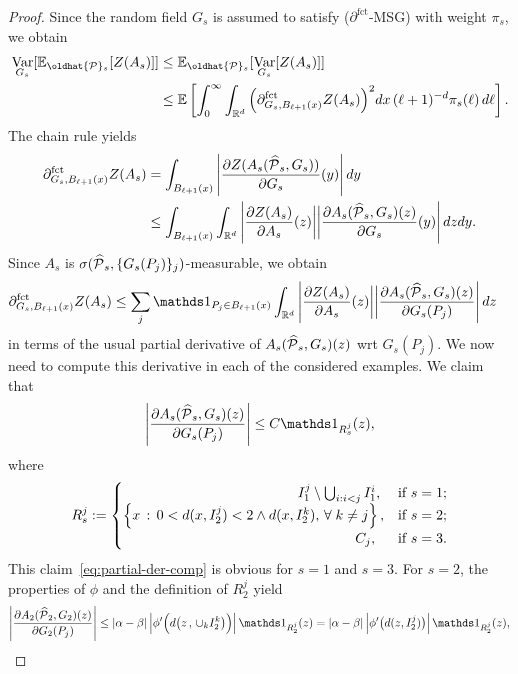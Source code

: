 \documentclass[AHL,Unicode,longabstracts]{cedram}
\newcommand{\R}{\mathbb R}
\newcommand{\E}{\mathbb{E}}
\newcommand{\expec}[1]{\mathbb{E}\left[#1 \right]}
\newcommand{\Pc}{\mathcal P}
\DeclareMathOperator{\Var}{Var}
\newcommand{\parfct}[1]{\partial_{#1}^{\operatorname{fct}}}
\renewcommand*{\hat}[1]{\mathchoice{\widehat{#1}}{\widehat{#1}}{\oldhat{#1}}{\oldhat{#1}}}\let\oldexists\exists
\renewcommand*{\exists}{\mathrel{\oldexists}}
\let\oldforall\forall
\renewcommand*{\forall}{\mathrel{\oldforall}}
\begin{document}
\begin{proof}
\noindent Since the random field $G_s$ is assumed to satisfy ($\parfct{}$-MSG) with weight $\pi_s$, we obtain
\begin{equation}\label{eq:mixex-0}
\begin{aligned}
\Var_{G_s}[\E_{\hat\Pc_s}[Z(A_s)]]&\le\E_{\hat\Pc_s}[\Var_{G_s}[Z(A_s)]]\\
&\le \expec{\int_0^\infty\int_{\R^d}\Big(\parfct{G_s,B_{\ell+1}(x)}Z(A_s)\Big)^2dx\,(\ell+1)^{-d}\pi_s(\ell)\,d\ell}.
\end{aligned}
\end{equation}
The chain rule yields
\begin{align*}
\parfct{G_s,B_{\ell+1}(x)}Z(A_s)&=\int_{B_{\ell+1}(x)}\left|\frac{\partial Z(A_s(\hat\Pc_s,G_s))}{\partial G_s}(y)\right|dy\\
&\le\int_{B_{\ell+1}(x)}\int_{\R^d}\left|\frac{\partial Z(A_s)}{\partial A_s}(z)\bigg|\bigg|\frac{\partial A_s(\hat\Pc_s,G_s)(z)}{\partial G_s}(y)\right|dzdy.
\end{align*}
Since $A_s$ is $\sigma(\hat\Pc_s,\{G_s(P_j)\}_j)$-measurable, we obtain
\begin{align}\label{eq:mixex-1}
\parfct{G_s,B_{\ell+1}(x)}Z(A_s)&\le\sum_j\mathds1_{P_j\in B_{\ell+1}(x)}\int_{\R^d}\left|\frac{\partial Z(A_s)}{\partial A_s}(z)\bigg|\bigg|\frac{\partial A_s(\hat\Pc_s,G_s)(z)}{\partial G_s(P_j)}\right|dz
\end{align}
in terms of the usual partial derivative of $A_s(\hat\Pc_s,G_s)(z)$ wrt $G_s(P_j)$. We now need to compute this derivative in each of the considered examples. We claim that
\begin{align}\label{eq:partial-der-comp}
\left|\frac{\partial A_s(\hat\Pc_s,G_s)(z)}{\partial G_s(P_j)}\right|\le C\mathds1_{R_s^j}(z),
\end{align}
where
\[
R_s^j:=
\begin{cases}
\mkern225mu I_1^j\setminus \bigcup_{i:i<j}I_1^i,&\text{if }s=1;\\
\left\{x\,:\, 0<d(x,I_2^j)< 2\wedge d(x,I_2^k),\,\forall k\ne j\right\},&\text{if }s=2;\\
\mkern299mu C_j,&\text{if }s=3.
\end{cases}
\]
This claim~\eqref{eq:partial-der-comp} is obvious for $s=1$ and $s=3$. For $s=2$, the properties of $\phi$ and the definition of $R_2^j$ yield
\[
\left|\frac{\partial A_2(\hat\Pc_2,G_2)(z)}{\partial G_2(P_j)}\right|\le |\alpha-\beta|\left|\phi'\Big(d\big(z\,,\,\cup_kI_2^k\big)\Big)\right|\mathds1_{R_2^j}(z)=|\alpha-\beta|\left|\phi'\big(d(z,I_2^j)\big)\right|\mathds1_{R_2^j}(z),
\]
\end{proof}
\end{document}
